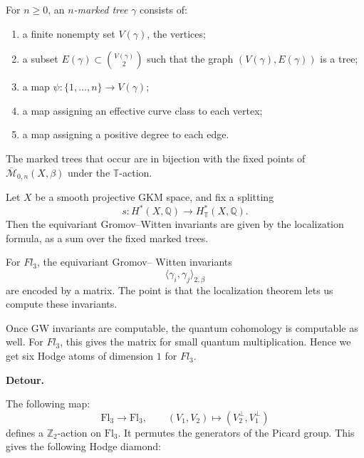 \begin{definition}
\label{definition-n-0}
For $n\ge 0$, an {\it $n$-marked tree}
$\gamma$ consists of:
\begin{enumerate}
\item a finite nonempty set
$V(\gamma)$, the vertices;
\item a subset
$E(\gamma)\subset \binom{V(\gamma)}{2}$
such that the graph
$(V(\gamma),E(\gamma))$ is a tree;
\item a map
$\psi:\{1,\dots,n\}\to V(\gamma)$;
\item a map assigning an effective
curve class to each vertex;
\item a map assigning a positive
degree to each edge.
\end{enumerate}
\end{definition}

\begin{lemma}
\label{lemma-marked-trees}
The marked trees that occur are in
bijection with the fixed points of
$\overline{\mathcal M}_{0,n}(X,\beta)$
under the $\mathbb{T}$-action.
\end{lemma}

\begin{theorem}
\label{theorem-let-x5}
Let $X$ be a smooth projective GKM
space, and fix a splitting
\[
s:H^*(X,\mathbb{Q})
\to
H^*_{\mathbb{T}}(X,\mathbb{Q}).
\]
Then the equivariant Gromov--Witten
invariants are given by the
localization formula, as a sum over
the fixed marked trees.
\end{theorem}

\begin{remark}
\label{remark-fl-3}
For $Fl_3$, the equivariant Gromov--
Witten invariants
\[
\langle \gamma_i,\gamma_j\rangle_{2,\beta}
\]
are encoded by a matrix.
The point is that the localization
theorem lets us compute these
invariants.

Once GW invariants are computable, the
quantum cohomology is computable as
well.
For $Fl_3$, this gives the matrix for
small quantum multiplication.
Hence we get six Hodge atoms of
dimension $1$ for $Fl_3$.
\end{remark}

\medskip\noindent
{\bf Detour.}

The following map:
\[
\mathrm{Fl}_3\to \mathrm{Fl}_3,
\qquad
(V_1,V_2)\mapsto
(V_2^\perp,V_1^\perp)
\]
defines a $\mathbb{Z}_2$-action on
\(\mathrm{Fl}_3\).
It permutes the generators of the
Picard group.
This gives the following Hodge diamond:

